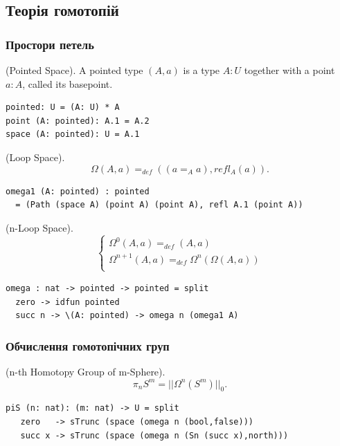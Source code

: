 \begin{definition}
\subsection{Теорія гомотопій}

\subsubsection{Простори петель}

\begin{definition} (Pointed Space). A pointed type $(A,a)$ is a type $A:U$
together with a point $a:A$, called its basepoint.
\begin{lstlisting}
pointed: U = (A: U) * A
point (A: pointed): A.1 = A.2
space (A: pointed): U = A.1
\end{lstlisting}
\end{definition}

\begin{definition} (Loop Space).
$$\Omega(A,a) =_{def} ((a =_A a), refl_A(a)).$$
\begin{lstlisting}
omega1 (A: pointed) : pointed
  = (Path (space A) (point A) (point A), refl A.1 (point A))
\end{lstlisting}
\end{definition}

\begin{definition} (n-Loop Space).
$$
\begin{cases}
\Omega^0(A, a) =_{def} (A, a)\\
\Omega^{n+1}(A,a) =_{def} \Omega^{n}(\Omega(A,a))\\
\end{cases}
$$
\begin{lstlisting}
omega : nat -> pointed -> pointed = split
  zero -> idfun pointed
  succ n -> \(A: pointed) -> omega n (omega1 A)
\end{lstlisting}
\end{definition}

\subsubsection{Обчислення гомотопічних груп}

\begin{definition} (n-th Homotopy Group of m-Sphere).
$$\pi_{n}S^{m} = ||\Omega^{n}(S^{m})||_0.$$
\begin{lstlisting}
piS (n: nat): (m: nat) -> U = split
   zero   -> sTrunc (space (omega n (bool,false)))
   succ x -> sTrunc (space (omega n (Sn (succ x),north)))
\end{lstlisting}
\end{definition}


\end{definition}
